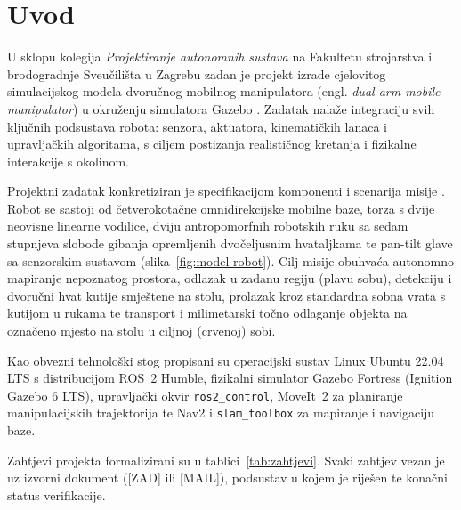\section{Uvod}
\label{sec:01-uvod}

U sklopu kolegija \emph{Projektiranje autonomnih sustava} na Fakultetu strojarstva i
brodogradnje Sveučilišta u Zagrebu zadan je projekt izrade cjelovitog simulacijskog modela
dvoručnog mobilnog manipulatora (engl. \emph{dual-arm mobile manipulator}) u okruženju simulatora
Gazebo \cite{zadatak2025}. Zadatak nalaže integraciju svih ključnih podsustava robota:
senzora, aktuatora, kinematičkih lanaca i upravljačkih algoritama, s ciljem postizanja
realističnog kretanja i fizikalne interakcije s okolinom.

Projektni zadatak konkretiziran je specifikacijom komponenti i scenarija misije \cite{mail2026}.
Robot se sastoji od četverokotačne omnidirekcijske mobilne baze, torza s dvije neovisne linearne
vodilice, dviju antropomorfnih robotskih ruku sa sedam stupnjeva slobode gibanja opremljenih
dvočeljusnim hvataljkama te pan-tilt glave sa senzorskim sustavom (slika~\ref{fig:model-robot}).
Cilj misije obuhvaća autonomno mapiranje nepoznatog prostora, odlazak u zadanu regiju (plavu
sobu), detekciju i dvoručni hvat kutije smještene na stolu, prolazak kroz standardna sobna vrata s
kutijom u rukama te transport i milimetarski točno odlaganje objekta na označeno mjesto na stolu u
ciljnoj (crvenoj) sobi.


Kao obvezni tehnološki stog propisani su operacijski sustav Linux Ubuntu 22.04 LTS s distribucijom
ROS~2 Humble, fizikalni simulator Gazebo Fortress (Ignition Gazebo 6 LTS), upravljački okvir
\texttt{ros2\_control}, MoveIt~2 za planiranje manipulacijskih trajektorija te Nav2 i
\texttt{slam\_toolbox} za mapiranje i navigaciju baze.

Zahtjevi projekta formalizirani su u tablici~\ref{tab:zahtjevi}. Svaki zahtjev vezan je uz izvorni
dokument ([ZAD] ili [MAIL]), podsustav u kojem je riješen te konačni status verifikacije.

